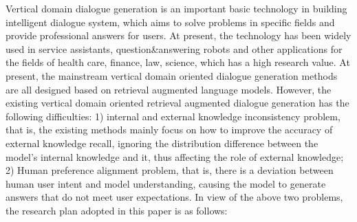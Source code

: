 Vertical domain dialogue generation is an important basic technology in building intelligent dialogue system, which aims to solve problems in specific fields and provide professional answers for users. At present, the technology has been widely used in service assistants, question\&answering robots and other applications for the fields of health care, finance, law, science, which has a high research value. At present, the mainstream vertical domain oriented dialogue generation methods are all designed based on retrieval augmented language models. However, the existing vertical domain oriented retrieval augmented dialogue generation has the following difficulties: 1) internal and external knowledge inconsistency problem, that is, the existing methods mainly focus on how to improve the accuracy of external knowledge recall, ignoring the distribution difference between the model's internal knowledge and it, thus affecting the role of external knowledge; 2) Human preference alignment problem, that is, there is a deviation between human user intent and model understanding, causing the model to generate answers that do not meet user expectations. In view of the above two problems, the research plan adopted in this paper is as follows:

